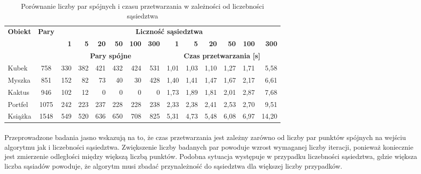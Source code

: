 \documentclass[../main.tex]{subfiles}
\begin{document}
    \begin{table}[H]
    \caption{Porównanie liczby par spójnych i czasu przetwarzania w zależności od liczebności sąsiedztwa}
     \label{t:neighbours}
     \begin{center}
        \begin{tabular}{|l|c|r|r|r|r|r|r||r|r|r|r|r|r|}
            \hline
            \multirow{3}{*}{\textbf{Obiekt}} &
            \multirow{3}{*}{\textbf{Pary}} & 
            \multicolumn{12}{c|}{\textbf{Liczność sąsiedztwa}} \\
            \cline{3-14} & {} &
            \textbf{1} & \textbf{5} & \textbf{20} & \textbf{50} & \textbf{100} & \textbf{300} &
            \textbf{1} & \textbf{5} & \textbf{20} & \textbf{50} & \textbf{100} & \textbf{300} \\
            \cline{3-14} & {} &
            \multicolumn{6}{c||}{\textbf{Pary spójne}} & \multicolumn{6}{c|}{\textbf{Czas przetwarzania [s]}}\\
             \hline
             {Kubek} & {758} & {330} & {382} & {421} & {432} & {424} & {531} & {1,01} & {1,03} & {1,10} & {1,27} & {1,71} & {5,58} \\
             \hline
             {Myszka} & {851} & {152} & {82} & {73} & {40} & {30} & {428} & {1,40} & {1,41} & {1,47} & {1,67} & {2,17} & {6,61} \\
             \hline
             {Kaktus} & {946} & {102} & {12} & {0} & {0} & {0} & {0} & {1,73} & {1,89} & {1,81} & {2,01} & {2,87} & {7,68} \\
            \hline
            {Portfel} & {1075} & {242} & {223} & {237} & {228} & {228} & {238} & {2,33} & {2,38} & {2,41} & {2,53} & {2,70} & {9,51} \\
             \hline
             {Książka} & {1548} & {549} & {520} & {636} & {650} & {708} & {825} & {5,31} & {4,73} & {5,48} & {6,08} & {6,97} & {14,20} \\
             \hline 
             
        \end{tabular}
     \end{center}
    \end{table}

    \paragraph{}
    Przeprowadzone badania jasno wskazują na to, że czas przetwarzania jest zależny zarówno od liczby par punktów spójnych na wejściu algorytmu jak i liczebności sąsiedztwa. Zwiększenie liczby badanych par powoduje wzrost wymaganej liczby iteracji, ponieważ koniecznie jest zmierzenie odległości między większą liczbą punktów. Podobna sytuacja występuje w przypadku liczebności sąsiedztwa, gdzie większa liczba sąsiadów powoduje, że algorytm musi zbadać przynależność do sąsiedztwa dla większej liczby przypadków.
\end{document}
